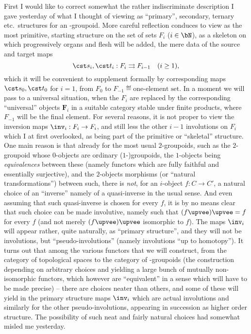 \label{sec:4}%
First I would like to correct somewhat the rather indiscriminate
description I gave yesterday of what I thought of viewing as
``primary'', secondary, ternary etc.\ structures for an
\oo-groupoid. More careful reflection conduces to view as the most
primitive, starting structure on the set of sets $F_i$ ($i\in\bN$), as
a skeleton on which progressively organs and flesh will be added, the
mere data of the source and target maps
\begin{equation*}
  \cst s_i, \cst t_i : F_i \rightrightarrows F_{i-1}
  \quad(i \ge 1),
\end{equation*}
which it will be convenient to supplement formally by corresponding
maps $\cst s_0, \cst t_0$ for $i=1$, from $F_0$ to
$F_{-1} \eqdef \text{one-element set}$. In a moment we will pass to a
universal situation, when the $F_i$ are replaced by the corresponding
``universal'' objects $\boldsymbol F_i$ in a suitable category stable
under finite products, where $F_{-1}$ will be the final element. For
several reasons, it is not proper to view the inversion maps
$\inv_i : F_i \to F_i$, and still less the other $i-1$ involutions on
$F_i$ which I at first overlooked, as being part of the primitive or
``skeletal'' structure. One main reason is that already for the most
usual $2$-groupoids, such as the $2$-groupoid whose $0$-objects are
ordinary ($1$-)groupoids, the $1$-objects being \emph{equivalences} between
these (namely functors which are fully faithful and essentially
surjective), and the $2$-objects morphisms (or ``natural
transformations'') between such, there is \emph{not}, for an
$i$-object $f: C \to C'$, a natural choice of an ``inverse'' namely of
a quasi-inverse in the usual sense. And even assuming that such
quasi-inverse is chosen for every $f$, it is by no means clear that
such choice can be made involutive, namely such that
$(f\upvee)\upvee = f$ for every $f$ (and not merely $(f\upvee)\upvee$
isomorphic to $f$). The maps $\inv_i$ will appear rather, quite
naturally, as ``primary structure'', and they will not be involutions,
but ``pseudo-involutions'' (namely involutions ``up to homotopy''). It
turns out that among the various functors that we will construct, from
the category of topological spaces to the category of \oo-groupoids
(the construction depending on arbitrary choices and yielding a large
bunch of mutually non-isomorphic functors, which however are
``equivalent'' in a sense which will have to be made precise) -- there
are choices neater than others, and some of these will yield in the
primary structure maps $\inv_i$ which are actual involutions and
similarly for the other pseudo-involutions, appearing in succession as
higher order structure. The possibility of such neat and fairly
natural choices had somewhat misled me yesterday.

